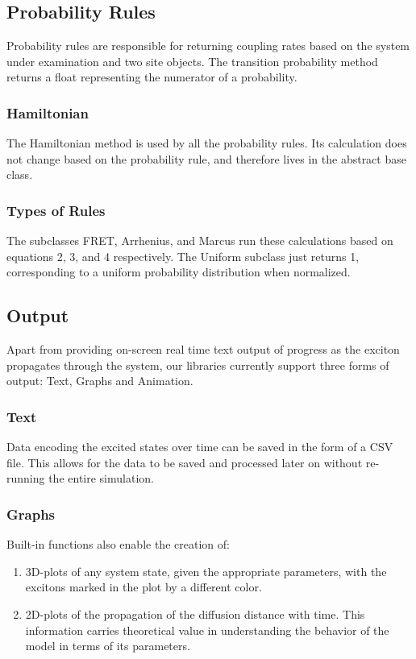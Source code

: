 \documentclass{article}
\begin{document}
\subsection{Probability Rules}

Probability rules are responsible for returning coupling rates based on the system under examination and two site objects. The transition probability method returns a float representing the numerator of a probability. 



\subsubsection{Hamiltonian}

The Hamiltonian method is used by all the probability rules. Its calculation does not change based on the probability rule, and therefore lives in the abstract base class.



\subsubsection{Types of Rules}

The subclasses FRET, Arrhenius, and Marcus run these calculations based on equations 2, 3, and 4 respectively. The Uniform subclass just returns 1, corresponding to a uniform probability distribution when normalized.


\subsection{Output}
Apart from providing on-screen real time text output of progress as the exciton propagates through the system, our libraries currently support three forms of output: Text, Graphs and Animation.

\subsubsection{Text}
Data encoding the excited states over time can be saved in the form of a CSV file. This allows for the data to be saved and processed later on without re-running the entire simulation.
\subsubsection{Graphs}
Built-in functions also enable the creation of:

\begin{enumerate}
    \item 3D-plots of any system state, given the appropriate parameters, with the excitons marked in the plot by a different color. 
    \item 2D-plots of the propagation of the diffusion distance with time. This information carries theoretical value in understanding the behavior of the model in terms of its parameters.
\end{enumerate}
\end{document}
